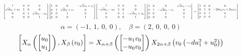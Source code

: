 \documentclass[11pt]{article}
\theoremstyle{definition}
\begin{document}
\[
\scaletoalign{\textwidth}{{\left[\begin{matrix}1 & 0 & 0 & 0\\\sqrt{d} u_{1} + u_{0} & 1 & 0 & 0\\0 & 0 & 1 & \sqrt{d} u_{1} - u_{0}\\0 & 0 & 0 & 1\end{matrix}\right]} {\left[\begin{matrix}1 & 0 & 0 & - \sqrt{d} v_{0} + v_{1}\\0 & 1 & \sqrt{d} v_{0} + v_{1} & 0\\0 & 0 & 1 & 0\\0 & 0 & 0 & 1\end{matrix}\right]} {\left[\begin{matrix}1 & 0 & 0 & 0\\- \sqrt{d} u_{1} - u_{0} & 1 & 0 & 0\\0 & 0 & 1 & - \sqrt{d} u_{1} + u_{0}\\0 & 0 & 0 & 1\end{matrix}\right]} {\left[\begin{matrix}1 & 0 & 0 & \sqrt{d} v_{0} - v_{1}\\0 & 1 & - \sqrt{d} v_{0} - v_{1} & 0\\0 & 0 & 1 & 0\\0 & 0 & 0 & 1\end{matrix}\right]} = {\left[\begin{matrix}1 & 0 & 0 & 0\\0 & 1 & 0 & - 2 d u_{1} v_{0} + 2 u_{0} v_{1}\\0 & 0 & 1 & 0\\0 & 0 & 0 & 1\end{matrix}\right]}}
\]
\[
\alpha = \left( -1, \  1, \  0, \  0\right), \quad \beta = \left( 2, \  0, \  0, \  0\right)
\]
\[
\scaletoalign{\textwidth}{\left[ X_{\alpha}\left(\left[\begin{matrix}u_{0}\\u_{1}\end{matrix}\right]\right), X_{\beta}\left(v_{0}\right) \right] = X_{\alpha + \beta}\left(\left[\begin{matrix}- u_{1} v_{0}\\- u_{0} v_{0}\end{matrix}\right]\right) X_{2\alpha + \beta}\left(v_{0} \left(- d u_{1}^{2} + u_{0}^{2}\right)\right)}
\]
\end{document}

